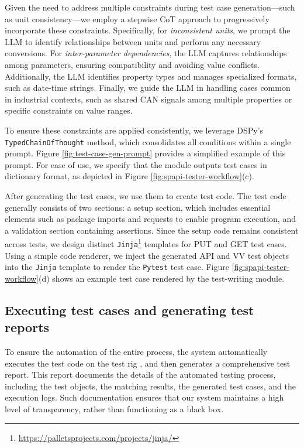 Given the need to address multiple constraints during test case generation—such as unit consistency—we employ a stepwise CoT approach to progressively incorporate these constraints. Specifically, for \textit{inconsistent units}, we prompt the LLM to identify relationships between units and perform any necessary conversions. For \textit{inter-parameter dependencies}, the LLM captures relationships among parameters, ensuring compatibility and avoiding value conflicts. Additionally, the LLM identifies property types and manages specialized formats, such as date-time strings. Finally, we guide the LLM in handling cases common in industrial contexts, such as shared CAN signals among multiple properties or specific constraints on value ranges.

To ensure these constraints are applied consistently, we leverage DSPy’s \texttt{TypedChainOfThought} method, which consolidates all conditions within a single prompt. Figure \ref{fig:test-case-gen-prompt} provides a simplified example of this prompt. For ease of use, we specify that the module outputs test cases in dictionary format, as depicted in Figure \ref{fig:spapi-tester-workflow}(c).

After generating the test cases, we use them to create test code.
The test code generally consists of two sections: a setup section, which includes essential elements such as package imports and requests to enable program execution, and a validation section containing assertions.
Since the setup code remains consistent across tests, we design distinct \texttt{Jinja}\footnote{\url{https://palletsprojects.com/projects/jinja/}} templates for PUT and GET test cases.
Using a simple code renderer, we inject the generated API and VV test objects into the \texttt{Jinja} template to render the \texttt{Pytest} test case. Figure \ref{fig:spapi-tester-workflow}(d) shows an example test case rendered by the test-writing module.

\subsection{Executing test cases and generating test reports}
To ensure the automation of the entire process, the system automatically executes the test code on the test rig \cite{asyraf2019fundamentals}, and then generates a comprehensive test report. This report documents the details of the automated testing process, including the test objects, the matching results, the generated test cases, and the execution logs. Such documentation ensures that our system maintains a high level of transparency, rather than functioning as a black box.

\vspace{0.2cm}